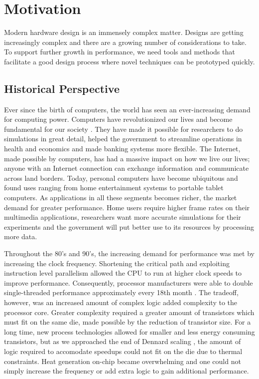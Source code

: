 \section{Motivation}

Modern hardware design is an immensely complex matter. Designs are getting
increasingly complex and there are a growing number of considerations to take.
To support further growth in performance, we need tools and methods that
facilitate a good design process where novel techniques can be prototyped
quickly.

\subsection{Historical Perspective}

Ever since the birth of computers, the world has seen an ever-increasing demand
for computing power. Computers have revolutionized our lives and become
fundamental for our society \cite{tanenbaum1984structured}. They have made it possible for
researchers to do simulations in great detail, helped the government to
streamline operations in health and economics and made banking systems more
flexible. The Internet, made possible by computers, has had a massive impact on
how we live our lives; anyone with an Internet connection can exchange
information and communicate across land borders. Today, personal computers have
become ubiquitous and found uses ranging from home entertainment systems to
portable tablet computers. As applications in all these segments becomes richer,
the market demand for greater performance. Home users require higher frame
rates on their multimedia applications, researchers want more accurate
simulations for their experiments and the government will put better use to its
resources by processing more data.

Throughout the 80's and 90's, the increasing demand for performance was met by
increasing the clock frequency. Shortening the critical path and exploiting
instruction level parallelism allowed the CPU to run at higher clock speeds to
improve performance. Consequently, processor manufacturers were able to double
single-threaded performance approximately every 18th month
\cite{moore1965cramming}. The tradeoff, however, was an increased amount of
complex logic added complexity to the processor core. Greater complexity
required a greater amount of transistors which must fit on the same die, made
possible by the reduction of transistor size. For a long time, new process
technologies allowed for smaller and less energy consuming transistors, but as
we approached the end of Dennard scaling
\cite{dennard1974design,esmaeilzadeh2011dark}, the amount of logic required to
accomodate speedups could not fit on the die due to thermal constraints. Heat
generation on-chip became overwhelming and one could not simply increase the
frequency or add extra logic to gain additional performance.

